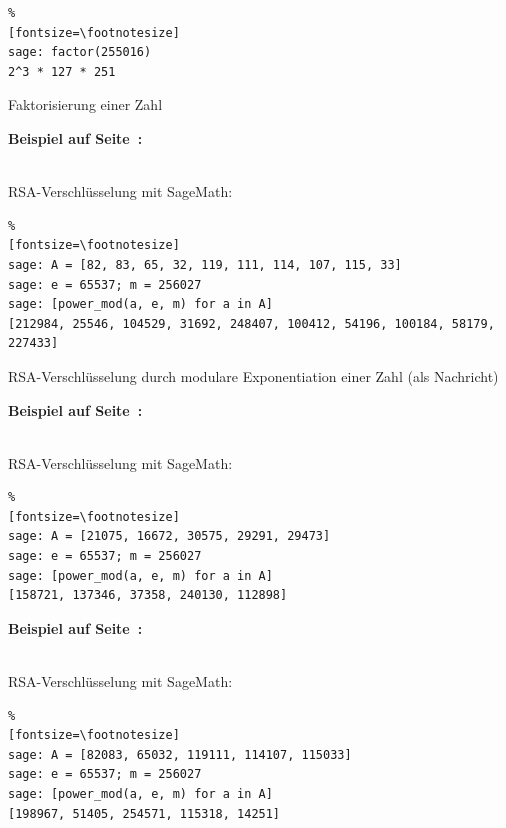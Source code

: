 \begin{refsegment}
\begin{sagecode}
\begin{Verbatim}%
[fontsize=\footnotesize]
sage: factor(255016)
2^3 * 127 * 251
\end{Verbatim}
\caption{Faktorisierung einer Zahl}
\end{sagecode}


\hypertarget{nt:AppArith4c}{%
 \textbf{Beispiel auf Seite~\pageref{SrcArith4c}:}}
\label{nt:AppArith4c}\\
RSA-Verschlüsselung mit SageMath:

\begin{sagecode}
\begin{Verbatim}%
[fontsize=\footnotesize]
sage: A = [82, 83, 65, 32, 119, 111, 114, 107, 115, 33]
sage: e = 65537; m = 256027
sage: [power_mod(a, e, m) for a in A]
[212984, 25546, 104529, 31692, 248407, 100412, 54196, 100184, 58179, 227433]
\end{Verbatim}
\caption{RSA-Verschlüsselung durch modulare Exponentiation einer Zahl (als Nachricht)}
\end{sagecode}


\hypertarget{nt:AppArith4d}{%
 \textbf{Beispiel auf Seite~\pageref{SrcArith4d}:}}
\label{nt:AppArith4d}\\
RSA-Verschlüsselung mit SageMath:

\begin{Verbatim}%
[fontsize=\footnotesize]
sage: A = [21075, 16672, 30575, 29291, 29473]
sage: e = 65537; m = 256027
sage: [power_mod(a, e, m) for a in A]
[158721, 137346, 37358, 240130, 112898]
\end{Verbatim}


\hypertarget{nt:AppArith4e}{%
 \textbf{Beispiel auf Seite~\pageref{SrcArith4e}:}}
\label{nt:AppArith4e}\\
RSA-Verschlüsselung mit SageMath:

\begin{Verbatim}%
[fontsize=\footnotesize]
sage: A = [82083, 65032, 119111, 114107, 115033]
sage: e = 65537; m = 256027
sage: [power_mod(a, e, m) for a in A]
[198967, 51405, 254571, 115318, 14251]
\end{Verbatim}




\hypertarget{NumberTheory_Sage_Number-of-RSA-keys}{}

\end{refsegment}
